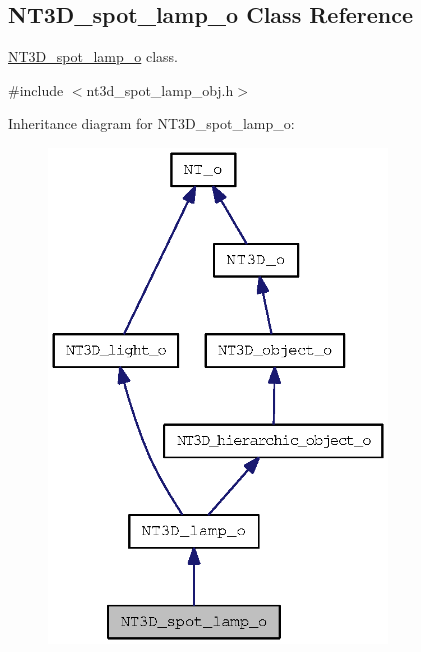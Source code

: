 \subsection{NT3D\_\-spot\_\-lamp\_\-o Class Reference}
\label{class_n_t3_d__spot__lamp__o}


\hyperlink{class_n_t3_d__spot__lamp__o}{NT3D\_\-spot\_\-lamp\_\-o} class.  




{\ttfamily \#include $<$nt3d\_\-spot\_\-lamp\_\-obj.h$>$}



Inheritance diagram for NT3D\_\-spot\_\-lamp\_\-o:
\nopagebreak
\begin{figure}[H]
\begin{center}
\leavevmode
\includegraphics[width=255pt]{class_n_t3_d__spot__lamp__o__inherit__graph}
\end{center}
\end{figure}



